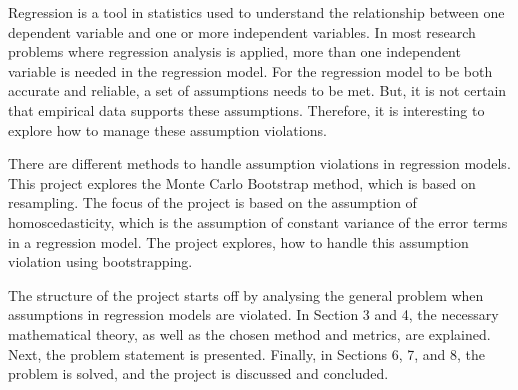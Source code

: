 
Regression is a tool in statistics used to understand the relationship between one dependent variable and one or more independent variables. In most research problems where regression analysis is applied, more than one independent variable is needed in the regression model. For the regression model to be both accurate and reliable, a set of assumptions needs to be met. But, it is not certain that empirical data supports these assumptions. Therefore, it is interesting to explore how to manage these assumption violations. \newline

\noindent There are different methods to handle assumption violations in regression models. This project explores the  Monte Carlo Bootstrap method, which is based on resampling. The focus of the project is based on the assumption of homoscedasticity, which is the assumption of constant variance of the error terms in a regression model. The project explores, how to handle this assumption violation using bootstrapping.\newline

\noindent The structure of the project starts off by analysing the general problem when assumptions in regression models are violated. In Section 3 and 4, the necessary mathematical theory, as well as the chosen method and metrics, are explained. Next, the problem statement is presented. Finally, in Sections 6, 7, and 8, the problem is solved, and the project is discussed and concluded.